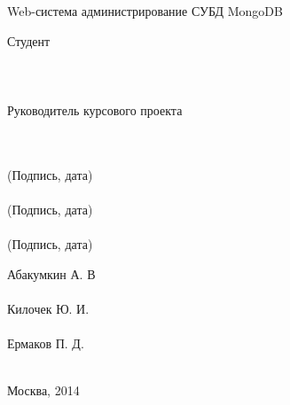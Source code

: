 \begin{titlepage}
\vfill

\begin{center}
  \LARGE Web-система администрирование СУБД MongoDB\\
\end{center}

\vfill

\begin{minipage}{0.3\textwidth}
  \begin{flushleft}
    Студент\\
    ~\\
    ~\\
    ~\\
    Руководитель курсового проекта\\
    ~\\
  \end{flushleft}
\end{minipage}
\begin{minipage}{0.3\textwidth}
  \begin{center}
    \hrulefill\\
    (Подпись, дата)\\
    \hrulefill\\
    (Подпись, дата)\\
    \hrulefill\\
    (Подпись, дата)\\
  \end{center}
\end{minipage}
\begin{minipage}{0.3\textwidth}
  \begin{center}
    Абакумкин А. В\\
    ~\\
    Килочек Ю. И.\\
    ~\\
    Ермаков П. Д.\\
    ~\\
  \end{center}
\end{minipage}

\vfill

\centering Москва, 2014

\end{titlepage}
